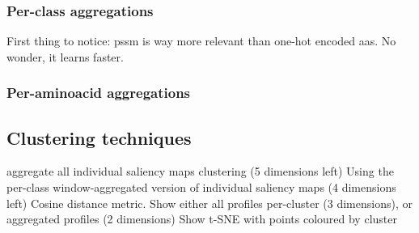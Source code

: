 		\subsubsection{Per-class aggregations}
		First thing to notice: pssm is way more relevant than one-hot encoded aas. No wonder, it learns faster.

		\subsubsection{Per-aminoacid aggregations}

	\subsection{Clustering techniques}
	aggregate all individual saliency maps %
	clustering (5 dimensions left)
	Using the per-class window-aggregated version of individual saliency maps (4 dimensions left)
	Cosine distance metric.
	Show either all profiles per-cluster (3 dimensions), or aggregated profiles (2 dimensions)
	Show t-SNE with points coloured by cluster
